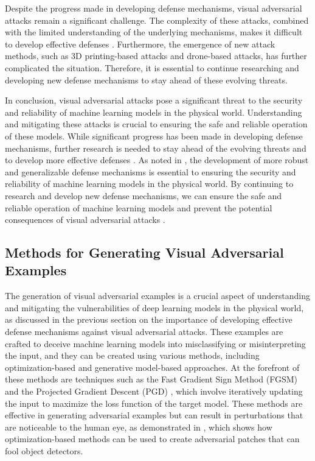 \documentclass[11pt,a4paper]{article}
\begin{document}
Despite the progress made in developing defense mechanisms, visual adversarial attacks remain a significant challenge. The complexity of these attacks, combined with the limited understanding of the underlying mechanisms, makes it difficult to develop effective defenses \cite{doi:10.1007/s11633-019-1211-x}. Furthermore, the emergence of new attack methods, such as 3D printing-based attacks and drone-based attacks, has further complicated the situation. Therefore, it is essential to continue researching and developing new defense mechanisms to stay ahead of these evolving threats.

In conclusion, visual adversarial attacks pose a significant threat to the security and reliability of machine learning models in the physical world. Understanding and mitigating these attacks is crucial to ensuring the safe and reliable operation of these models. While significant progress has been made in developing defense mechanisms, further research is needed to stay ahead of the evolving threats and to develop more effective defenses \cite{doi:10.1109/access.2022.3216291}. As noted in \cite{doi:10.58496/adsa/2024/011}, the development of more robust and generalizable defense mechanisms is essential to ensuring the security and reliability of machine learning models in the physical world. By continuing to research and develop new defense mechanisms, we can ensure the safe and reliable operation of machine learning models and prevent the potential consequences of visual adversarial attacks \cite{doi:10.1109/lra.2022.3189783}.


\subsection{Methods for Generating Visual Adversarial Examples}


The generation of visual adversarial examples is a crucial aspect of understanding and mitigating the vulnerabilities of deep learning models in the physical world, as discussed in the previous section on the importance of developing effective defense mechanisms against visual adversarial attacks. These examples are crafted to deceive machine learning models into misclassifying or misinterpreting the input, and they can be created using various methods, including optimization-based and generative model-based approaches. At the forefront of these methods are techniques such as the Fast Gradient Sign Method (FGSM) \cite{doi:10.24963/ijcai.2021/694} and the Projected Gradient Descent (PGD) \cite{arxiv:1902.06705}, which involve iteratively updating the input to maximize the loss function of the target model. These methods are effective in generating adversarial examples but can result in perturbations that are noticeable to the human eye, as demonstrated in \cite{arxiv:1712.09665}, which shows how optimization-based methods can be used to create adversarial patches that can fool object detectors.
\end{document}
